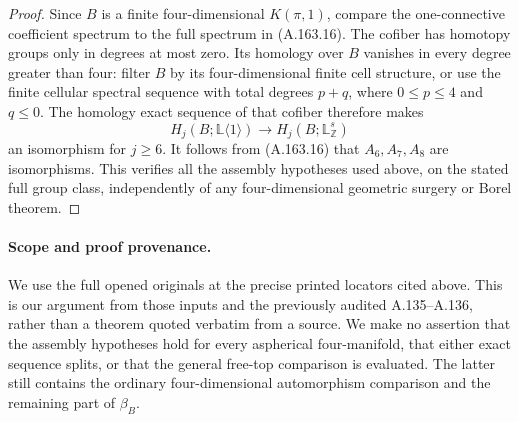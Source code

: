 \begin{proof}
Since $B$ is a finite four-dimensional $K(\pi,1)$, compare the
one-connective coefficient spectrum to the full spectrum in (A.163.16).
The cofiber has homotopy groups only in degrees at most zero.
Its homology over $B$ vanishes in every degree greater than four:
filter $B$ by its four-dimensional finite cell structure, or use the
finite cellular spectral sequence with total degrees $p+q$, where
$0\le p\le4$ and $q\le0$. The homology exact sequence of that
cofiber therefore makes
\[
 H_j(B;\mathbb L\langle1\rangle)
             \longrightarrow H_j(B;\mathbb L^s_{\mathbb Z})
\]
an isomorphism for $j\ge6$. It follows from (A.163.16) that $A_6,A_7,A_8$
are isomorphisms. This verifies all the assembly hypotheses used
above, on the stated full group class, independently of any
four-dimensional geometric surgery or Borel theorem.
\end{proof}

\paragraph{Scope and proof provenance.}
We use the full opened originals at the precise printed locators cited
above. This is our argument from those inputs and the previously
audited A.135--A.136, rather than a theorem quoted verbatim from a
source. We make no assertion that the assembly hypotheses hold for
every aspherical four-manifold, that either exact sequence splits,
or that the general free-top comparison is evaluated. The latter
still contains the ordinary four-dimensional automorphism comparison
and the remaining part of $\beta_B$.
